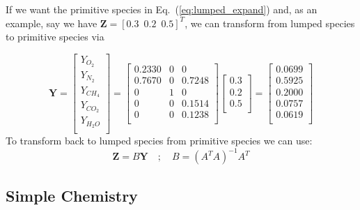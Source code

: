 If we want the primitive species in Eq.~(\ref{eq:lumped_expand}) and, as an example, say we have $\mathbf{Z} = [0.3 \,\,\, 0.2 \,\,\, 0.5]^T$, we can transform from lumped species to primitive species via

\begin{displaymath}
\mathbf{Y}=\left[\begin{array}{c}
       Y_{O_2} \\
       Y_{N_2} \\
       Y_{CH_4} \\
       Y_{CO_2} \\
       Y_{H_2O} \\
     \end{array}\right]
     =\left[\begin{array}{ccc}
     0.2330 & 0 & 0 \\
     0.7670 & 0 & 0.7248 \\
     0 & 1 & 0 \\
     0 & 0 & 0.1514 \\
     0 & 0 & 0.1238 \\
     \end{array}\right]
     \left[\begin{array}{c}
     0.3 \\
     0.2 \\
     0.5 \\
     \end{array}\right]
     =\left[\begin{array}{c}
     0.0699\\
     0.5925\\
     0.2000\\
     0.0757\\
     0.0619\\
     \end{array}\right]
\end{displaymath}
To transform back to lumped species from primitive species we can use:
\begin{equation}\label{eq:transform_back}
\textbf{Z}=B\textbf{Y} \quad ; \quad B=(A^TA)^{-1}A^T
\end{equation}

\subsection{Simple Chemistry}


